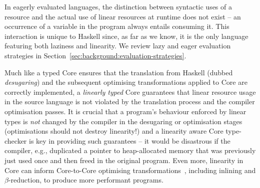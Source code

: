 \documentclass[acmsmall, screen, review]{acmart}
\begin{document}
\begin{itemize}
        In eagerly evaluated languages, the distinction between syntactic uses of a
        resource and the actual use of linear resources at runtime does not exist --
        an occurrence of a variable in the program always entails consuming it.
        This interaction is unique to Haskell since, as far as we know, it is the
        only language featuring both laziness and linearity.
        We review lazy and eager evaluation strategies in Section~\ref{sec:background:evaluation-strategies}.

\end{itemize}
%

%
Much like a typed Core ensures that the translation from Haskell (dubbed
\emph{desugaring}) and the subsequent optimising transformations applied to
Core are correctly implemented, a \emph{linearly typed} Core guarantees that
linear resource usage in the source language is not violated by the translation
process and the compiler optimisation passes.
%
It is crucial that a program's behaviour enforced by linear types is \emph{not}
changed by the compiler in the desugaring or optimisation stages (optimisations
should not destroy linearity!) and a linearity aware Core type-checker is key in
providing such guarantees -- it would be disastrous if the compiler, e.g.,
duplicated a pointer to heap-allocated memory that was previously just used
once and then freed in the original program.
%
Even more, linearity in Core can inform Core-to-Core optimising
transformations~\cite{cite:let-floating,peytonjones1997a,cite:linearhaskell},
including inlining and $\beta$-reduction, to produce more performant programs.

\end{document}
